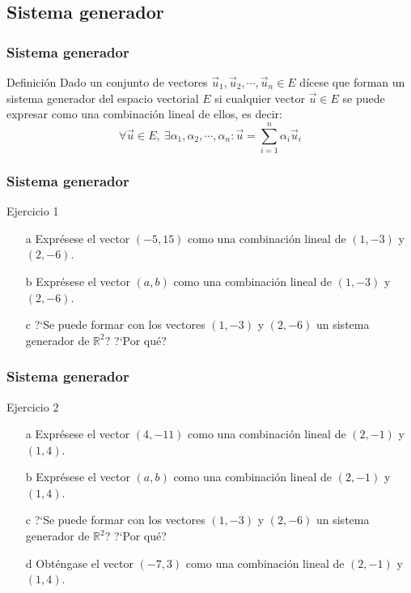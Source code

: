 \documentclass{beamer}
\begin{document}
\subsection{Sistema generador}
  \begin{frame}
  \frametitle{Sistema generador}
  \begin{block}{Definici\'on}
Dado un conjunto de vectores $\vec u_1,\vec u_2,\cdots,\vec u_n\in E$ d\'icese que forman un sistema generador del espacio vectorial $E$ si cualquier vector $\vec u\in E$ se puede expresar como una combinaci\'on lineal de ellos, es decir:
\[\forall \vec u \in E,\ \exists \alpha_1,\alpha_2,\cdots,\alpha_n : \vec u = \sum_{i=1}^n\alpha_i  \vec u_i\]  
\end{block}
  \end{frame}

 \begin{frame}
  \frametitle{Sistema generador}
  \begin{block}{Ejercicio 1}
\begin{itemize}
\item[a] Expr\'esese el vector $(-5,15)$ como una combinaci\'on lineal de $(1,-3)$ y $(2,-6)$.
\item[b] Expr\'esese el vector $(a,b)$ como una combinaci\'on lineal de $(1,-3)$ y $(2,-6)$.
\item[c] ?`Se puede formar con los vectores $(1,-3)$ y $(2,-6)$ un sistema generador de $\mathbb R^2$? ?`Por qu\'e?
\end{itemize}
\end{block}
  \end{frame}
  
   \begin{frame}
  \frametitle{Sistema generador}
  \begin{block}{Ejercicio 2}
\begin{itemize}
\item[a] Expr\'esese el vector $(4,-11)$ como una combinaci\'on lineal de $(2,-1)$ y $(1,4)$.
\item[b] Expr\'esese el vector $(a,b)$ como una combinaci\'on lineal de $(2,-1)$ y $(1,4)$.
\item[c] ?`Se puede formar con los vectores $(1,-3)$ y $(2,-6)$ un sistema generador de $\mathbb R^2$? ?`Por qu\'e?
\item[d] Obt\'engase el vector $(-7,3)$ como una combinaci\'on lineal de $(2,-1)$ y $(1,4)$.
\end{itemize}
\end{block}
  \end{frame}
  
\end{document}
